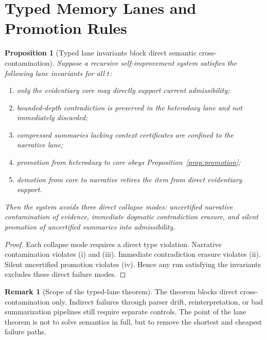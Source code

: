 \documentclass[11pt]{article}
\newtheorem{proposition}[theorem]{Proposition}
\theoremstyle{definition}
\newtheorem{remark}[theorem]{Remark}
\newcommand{\1}{\mathbf{1}}
\begin{document}
\section{Typed Memory Lanes and Promotion Rules}
\begin{proposition}[Typed lane invariants block direct semantic cross-contamination]\label{prop:typed_lanes}
Suppose a recursive self-improvement system satisfies the following lane invariants for all $t$:
\begin{enumerate}[label=(\roman*), leftmargin=2em]
  \item only the evidentiary core may directly support current admissibility;
  \item bounded-depth contradiction is preserved in the heterodoxy lane and not immediately discarded;
  \item compressed summaries lacking context certificates are confined to the narrative lane;
  \item promotion from heterodoxy to core obeys Proposition~\ref{prop:promotion};
  \item demotion from core to narrative retires the item from direct evidentiary support.
\end{enumerate}
Then the system avoids three \emph{direct} collapse modes: uncertified narrative contamination of evidence, immediate dogmatic contradiction erasure, and silent promotion of uncertified summaries into admissibility.
\end{proposition}

\begin{proof}
Each collapse mode requires a direct type violation. Narrative contamination violates (i) and (iii). Immediate contradiction erasure violates (ii). Silent uncertified promotion violates (iv). Hence any run satisfying the invariants excludes these direct failure modes.
\end{proof}

\begin{remark}[Scope of the typed-lane theorem]
The theorem blocks direct cross-contamination only. Indirect failures through parser drift, reinterpretation, or bad summarization pipelines still require separate controls. The point of the lane theorem is not to solve semantics in full, but to remove the shortest and cheapest failure paths.
\end{remark}
\end{document}
